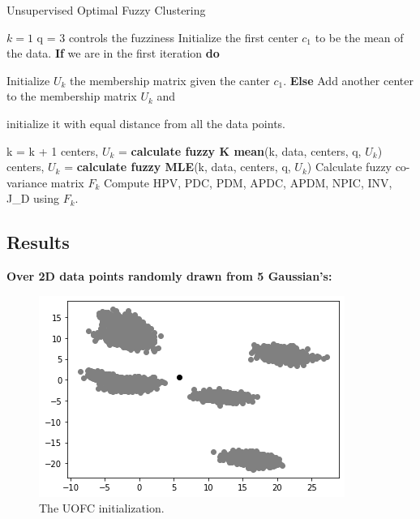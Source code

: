 \documentclass[12pt, a4paper]{paper}
\begin{document}
\begin{algorithm}
{\fontsize{10pt}{10pt}\selectfont
\caption{Unsupervised Optimal Fuzzy Clustering}\label{alg:BrothForce}
\begin{algorithmic}[1]
\State $k = 1$
\State q = 3 controls the fuzziness
\State Initialize the first center $c_{1}$ to be the mean of the data.
\State \textbf{If} we are in the first iteration \textbf{do}

Initialize $U_{k}$ the membership matrix given the canter $c_{1}$.
\State \textbf{Else} Add another center to the membership matrix $U_{k}$ and 

initialize it with equal distance from all the data points. 

k = k + 1
\State centers, $U_{k}$ = \textbf{calculate fuzzy K mean}(k, data, centers, q, $U_{k}$)
\State centers, $U_{k}$ = \textbf{calculate fuzzy MLE}(k, data, centers, q, $U_{k}$)
\State Calculate fuzzy co-variance matrix $F_{k}$ 
\State Compute HPV, PDC, PDM, APDC, APDM, NPIC, INV, J\_D using $F_{k}$.
\EndWhile 
\end{algorithmic}
}
\end{algorithm} 

\newpage
\subsection*{Results}
\textbf{Over 2D data points randomly drawn from 5 Gaussian’s:}

\begin{figure}[h!]
\centering
\includegraphics[scale=0.7]{init_gaussians_UOFC.png}
\caption{The UOFC initialization.}
\label{fig:Circular_3}
\end{figure}
\end{document}
